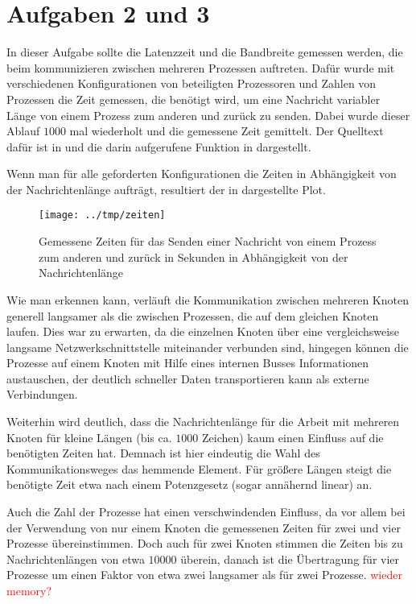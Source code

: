 \section*{Aufgaben 2 und 3}
In dieser Aufgabe sollte die Latenzzeit und die Bandbreite gemessen werden, die
beim kommunizieren zwischen mehreren Prozessen auftreten. Dafür wurde mit verschiedenen
Konfigurationen von beteiligten Prozessoren und Zahlen von Prozessen die Zeit gemessen,
die benötigt wird, um eine Nachricht variabler Länge von einem Prozess zum anderen
und zurück zu senden. Dabei wurde dieser Ablauf $1000$ mal wiederholt und die 
gemessene Zeit gemittelt. Der Quelltext dafür ist in  und die darin
aufgerufene Funktion in  dargestellt.




Wenn man für alle geforderten Konfigurationen die Zeiten in Abhängigkeit von der
Nachrichtenlänge aufträgt, resultiert der in  dargestellte Plot.

\begin{figure}[htb]
  \centering
  \texttt{[image: ../tmp/zeiten]}
  \caption{Gemessene Zeiten für das Senden einer Nachricht von einem Prozess zum
  anderen und zurück in Sekunden in Abhängigkeit von der Nachrichtenlänge}
  \label{fig:zeiten}
\end{figure}

Wie man erkennen kann, verläuft die Kommunikation zwischen mehreren Knoten generell
langsamer als die zwischen Prozessen, die auf dem gleichen Knoten laufen. Dies war 
zu erwarten, da die einzelnen Knoten über eine vergleichsweise langsame Netzwerkschnittstelle
miteinander verbunden sind, hingegen können die Prozesse auf einem Knoten mit Hilfe
eines internen Busses Informationen austauschen, der deutlich schneller Daten
transportieren kann als externe Verbindungen.

Weiterhin wird deutlich, dass die Nachrichtenlänge für die Arbeit mit mehreren
Knoten für kleine Längen (bis ca. $1000$ Zeichen) kaum einen Einfluss auf die
benötigten Zeiten hat. Demnach ist hier eindeutig die Wahl des Kommunikationsweges
das hemmende Element. Für größere Längen steigt die benötigte Zeit etwa nach einem 
Potenzgesetz (sogar annähernd linear) an. 

Auch die Zahl der Prozesse hat einen verschwindenden Einfluss, da vor allem bei der
Verwendung von nur einem Knoten die gemessenen Zeiten für zwei und vier Prozesse
übereinstimmen. Doch auch für zwei Knoten stimmen die Zeiten bis zu Nachrichtenlängen 
von etwa $10000$ überein, danach ist die Übertragung für vier Prozesse um einen Faktor
von etwa zwei langsamer als für zwei Prozesse. \textcolor{red}{wieder memory?}

